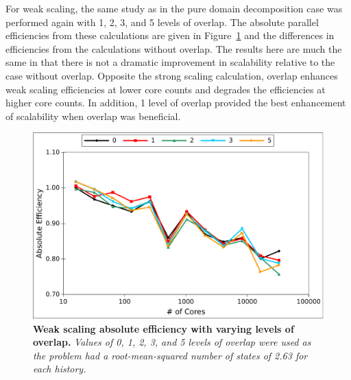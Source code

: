 For weak scaling, the same study as in the pure domain decomposition
case was performed again with 1, 2, 3, and 5 levels of overlap. The
absolute parallel efficiencies from these calculations are given in
Figure~\ref{fig:titan_weak_overlap} and the differences in
efficiencies from the calculations without overlap. The results here
are much the same in that there is not a dramatic improvement in
scalability relative to the case without overlap. Opposite the strong
scaling calculation, overlap enhances weak scaling efficiencies at
lower core counts and degrades the efficiencies at higher core
counts. In addition, 1 level of overlap provided the best enhancement
of scalability when overlap was beneficial. 

\begin{figure}[t!]
  \begin{center}
    \includegraphics[width=6in]{chapters/parallel_mc/titan_weak_overlap.pdf}
  \end{center}
  \caption{\textbf{Weak scaling absolute efficiency with varying
      levels of overlap.} \textit{Values of 0, 1, 2, 3, and 5 levels
      of overlap were used as the problem had a root-mean-squared
      number of states of 2.63 for each history.}}
  \label{fig:titan_weak_overlap}
\end{figure}

